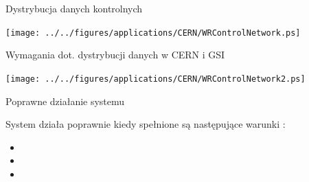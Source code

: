 \documentclass[compress,red]{beamer}
\begin{document}
\begin{frame}{Dystrybucja danych kontrolnych}

    \begin{center}
    \texttt{[image: ../../figures/applications/CERN/WRControlNetwork.ps]}
    \end{center}


\end{frame}
\begin{frame}{Wymagania dot. dystrybucji danych w CERN i GSI}

    \begin{center}
    \texttt{[image: ../../figures/applications/CERN/WRControlNetwork2.ps]}
    \end{center}


\end{frame}
\begin{frame}{Poprawne działanie systemu}


  System działa poprawnie kiedy spełnione są następujące warunki :
  
  \begin{itemize}
    \item \color{blue}{Wszystkie odbiorniki (nodes) są z synchronizowane z wymaganą dokładnością}
    \item  \color{red}{Wszystkie odbiorniki (nodes) otrzymują dane kontrolne (Control Messages)}
    \item  \color{red}{Dane kontrolne (Control Messages) docierają do wszystkich odbiorników (nodes)
          w czasie mniejszym niż wymagana maksymalna latencja.}
  \end{itemize}

\end{frame}
\end{document}
